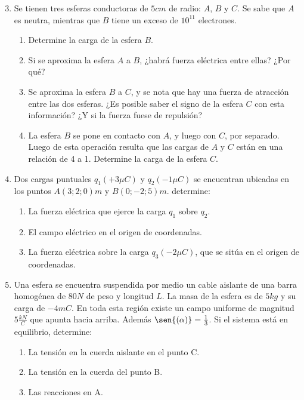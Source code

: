 \documentclass[12pt, twoside]{article}
\begin{document}
\begin{enumerate}
	\setcounter{enumi}{2}
	\item Se tienen tres esferas conductoras de $5 cm$ de radio: $A$, $B$ y $C$.
		Se sabe que $A$ es neutra,
		mientras que $B$ tiene un exceso de $10^{11}$ electrones.
		\begin{enumerate}
			\item Determine la carga de la esfera $B$.

			\item Si se aproxima la esfera $A$ a $B$,
				¿habrá fuerza eléctrica entre ellas?
				¿Por qué?

			\item Se aproxima la esfera $B$ a $C$,
				y se nota que hay una fuerza de atracción entre las dos esferas.
				¿Es posible saber el signo de la esfera $C$ con esta información?
				¿Y si la fuerza fuese de repulsión?

			\item La esfera $B$ se pone en contacto con $A$, y luego con $C$, por separado.
				Luego de esta operación resulta que
				las cargas de $A$ y $C$ están en una relación de 4 a 1.
				Determine la carga de la esfera $C$.
		\end{enumerate}

	\setcounter{enumi}{4}
	\item Dos cargas puntuales $q_1(+3\mu C)$ y $q_2(-1\mu C)$
		se encuentran ubicadas en los puntos $A(3;2;0)m$ y $B(0;-2;5)m$.
		determine:
		\begin{enumerate}
			\item La fuerza eléctrica que ejerce la carga $q_1$ sobre $q_2$.

			\item El campo eléctrico en el origen de coordenadas.

			\item La fuerza eléctrica sobre la carga $q_3(-2\mu C)$,
				que se sitúa en el origen de coordenadas.
		\end{enumerate}

	\setcounter{enumi}{8}
	\item Una esfera se encuentra suspendida por medio un cable aislante
		de una barra homogénea de $80N$ de peso y longitud $L$.
		La masa de la esfera es de $5kg$ y su carga de $-4mC$.
		En toda esta región existe un campo uniforme de magnitud $5 \frac{kN}{C}$
		que apunta hacia arriba.
		Además $\sen{(\alpha)}=\frac{1}{3}$.
		Si el sistema está en equilibrio, determine:
		\begin{enumerate}
			\item La tensión en la cuerda aislante en el punto C.

			\item La tensión en la cuerda del punto B.

			\item Las reacciones en A.
		\end{enumerate}
\end{enumerate}
\end{document}
